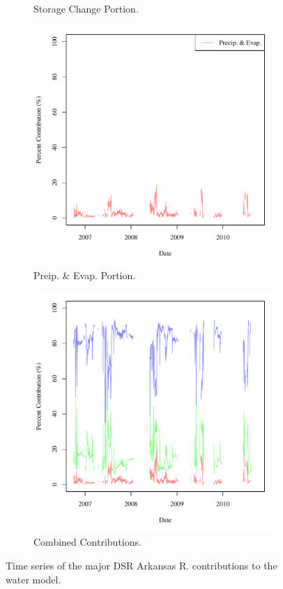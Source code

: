 \begin{linenumbers}
\begin{figure}[htbp]
\begin{subfigure}{0.5\textwidth}
		\caption{Storage Change Portion.}
		\label{sub:DSRWStore}
	\end{subfigure}
	\begin{subfigure}{0.5\textwidth}
		\centering
		\includegraphics[width=0.9\linewidth]{"Figures/Results_DSR/M Water Contrib 2"}
		\caption{Preip. \& Evap. Portion.}
		\label{sub:DSRWAtm}
	\end{subfigure}%
	\begin{subfigure}{0.5\textwidth}
		\centering
		\includegraphics[width=0.9\linewidth]{"Figures/Results_DSR/M Water Contrib 4"}
		\caption{Combined Contributions.}
		\label{sub:DSRWComb}
	\end{subfigure}
	\caption[Time series of the major DSR Arkansas R. contributions to the water model.]{Time series of the major DSR Arkansas R. contributions to the water model.}
	\label{fig:DSRWaterContrib}
\end{figure}


\end{linenumbers}
